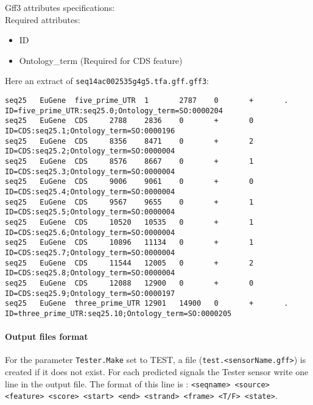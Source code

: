 Gff3 attributes specifications:\\
Required attributes:\\ 
	\begin{itemize}
	\item ID
	\item Ontology\_term (Required for CDS feature)
	\end{itemize}

Here an extract of \texttt{seq14ac002535g4g5.tfa.gff.gff3}:
\begin{Verbatim}[fontsize=\tiny]
seq25   EuGene  five_prime_UTR  1       2787    0       +       .       ID=five_prime_UTR:seq25.0;Ontology_term=SO:0000204
seq25   EuGene  CDS     2788    2836    0       +       0       ID=CDS:seq25.1;Ontology_term=SO:0000196
seq25   EuGene  CDS     8356    8471    0       +       2       ID=CDS:seq25.2;Ontology_term=SO:0000004
seq25   EuGene  CDS     8576    8667    0       +       1       ID=CDS:seq25.3;Ontology_term=SO:0000004
seq25   EuGene  CDS     9006    9061    0       +       0       ID=CDS:seq25.4;Ontology_term=SO:0000004
seq25   EuGene  CDS     9567    9655    0       +       1       ID=CDS:seq25.5;Ontology_term=SO:0000004
seq25   EuGene  CDS     10520   10535   0       +       1       ID=CDS:seq25.6;Ontology_term=SO:0000004
seq25   EuGene  CDS     10896   11134   0       +       1       ID=CDS:seq25.7;Ontology_term=SO:0000004
seq25   EuGene  CDS     11544   12005   0       +       2       ID=CDS:seq25.8;Ontology_term=SO:0000004
seq25   EuGene  CDS     12088   12900   0       +       0       ID=CDS:seq25.9;Ontology_term=SO:0000197
seq25   EuGene  three_prime_UTR 12901   14900   0       +       .       ID=three_prime_UTR:seq25.10;Ontology_term=SO:0000205
\end{Verbatim}


\paragraph{Output files format}

For the parameter \texttt{Tester.Make} set to TEST, a file
(\texttt{test.<sensorName.gff>}) is created if it does not exist.  For each
predicted signals the Tester sensor write one line in the output file.
The format of this line is : \texttt{<seqname> <source> <feature>
  <score>
  <start> <end> <strand> <frame> <T/F> <state>}.

